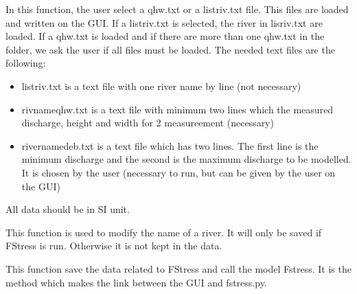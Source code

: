 \documentclass[letterpaper,10pt,english]{sphinxmanual}
\begin{document}
\begin{fulllineitems}
\begin{fulllineitems}
\end{fulllineitems}


\begin{fulllineitems}
\label{\detokenize{index:src_GUI.fstress_GUI.FstressW.load_txt}}
In this function, the user select a qhw.txt or a listriv.txt file. This files are loaded and written on the GUI.
If a listriv.txt is selected, the river in lisriv.txt are loaded. If a qhw.txt is loaded and if there are
more than one qhw.txt in the folder, we ask the user if all files must be loaded. The needed text files are
the following:
\begin{itemize}
\item {} 
listriv.txt is a text file with one river name by line (not necessary)

\item {} 
rivnameqhw.txt is a text file with minimum two lines which the measured discharge, height and width for
2 measureement (necessary)

\item {} 
rivernamedeb.txt is a text file which has two lines. The first line is the minimum discharge and the second is
the maximum discharge to be modelled. It is chosen by the user (necessary to run, but can be given by the user
on the GUI)

\end{itemize}

All data should be in SI unit.

\end{fulllineitems}


\begin{fulllineitems}
\label{\detokenize{index:src_GUI.fstress_GUI.FstressW.modify_name}}
This function is used to modify the name of a river. It will only be saved if FStress is run. Otherwise it
is not kept in the data.

\end{fulllineitems}


\begin{fulllineitems}
\label{\detokenize{index:src_GUI.fstress_GUI.FstressW.runsave_fstress}}
This function save the data related to FStress and call the model Fstress. It is the method which makes the
link between the GUI and fstress.py.


\end{fulllineitems}
\end{fulllineitems}
\end{document}

